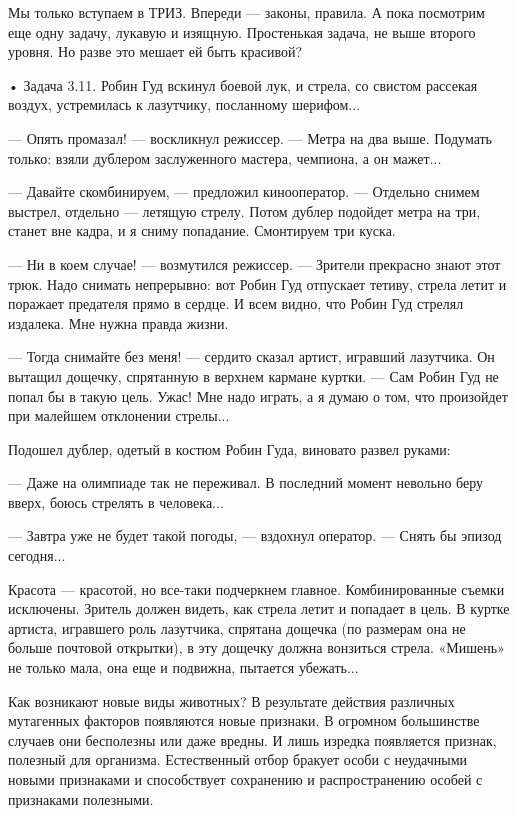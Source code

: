 Мы только вступаем в ТРИЗ. Впереди — законы, правила. А пока посмотрим
еще  одну  задачу, лукавую  и  изящную.  Простенькая задача,  не  выше
второго уровня. Но разве это мешает ей быть красивой?

• Задача  3.11. Робин  Гуд вскинул  боевой лук,  и стрела,  со свистом
рассекая воздух, устремилась к лазутчику, посланному шерифом...

— Опять промазал! — воскликнул режиссер. — Метра на два выше. Подумать
только: взяли дублером заслуженного мастера, чемпиона, а он мажет...

— Давайте  скомбинируем, —  предложил кинооператор. —  Отдельно снимем
выстрел, отдельно  — летящую  стрелу. Потом  дублер подойдет  метра на
три, станет вне кадра, и я сниму попадание. Смонтируем три куска.

— Ни в  коем случае! — возмутился режиссер. —  Зрители прекрасно знают
этот трюк.  Надо снимать непрерывно:  вот Робин Гуд  отпускает тетиву,
стрела летит  и поражает предателя прямо  в сердце. И всем  видно, что
Робин Гуд стрелял издалека. Мне нужна правда жизни.

—  Тогда  снимайте  без  меня!   —  сердито  сказал  артист,  игравший
лазутчика. Он вытащил дощечку, спрятанную  в верхнем кармане куртки. —
Сам Робин  Гуд не попал бы  в такую цель.  Ужас! Мне надо играть,  а я
думаю о том, что произойдет при малейшем отклонении стрелы...

Подошел дублер, одетый в костюм Робин Гуда, виновато развел руками:

— Даже на олимпиаде так не переживал. В последний момент невольно беру
вверх, боюсь стрелять в человека...

— Завтра  уже не будет такой  погоды, — вздохнул оператор.  — Снять бы
эпизод сегодня...

Красота —  красотой, но  все-таки подчеркнем  главное. Комбинированные
съемки исключены. Зритель должен видеть, как стрела летит и попадает в
цель. В куртке артиста, игравшего роль лазутчика, спрятана дощечка (по
размерам  она  не больше  почтовой  открытки),  в эту  дощечку  должна
вонзиться  стрела.  «Мишень»  не  только мала,  она  еще  и  подвижна,
пытается убежать...





Как  возникают новые  виды животных?  В результате  действия различных
мутагенных факторов появляются новые  признаки. В огромном большинстве
случаев  они бесполезны  или даже  вредны. И  лишь изредка  появляется
признак,  полезный для  организма.  Естественный  отбор бракует  особи
с   неудачными  новыми   признаками   и   способствует  сохранению   и
распространению особей с признаками полезными.

